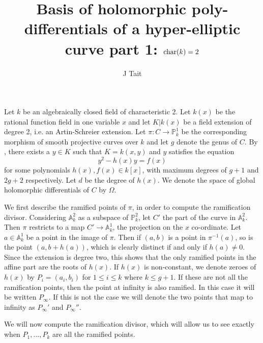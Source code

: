\documentclass[11pt]{article} %
\title{Basis of holomorphic poly-differentials of a hyper-elliptic curve part 1: $\operatorname{char} (k)=2$}
\author{J Tait}
\theoremstyle{remark}\newtheorem*{rem}{Remark}
\begin{document}
\maketitle


Let $k$ be an algebraically closed field of characteristic 2.
Let $k(x)$ be the rational function field in one variable $x$ and let $K|k(x)$ be a field extension of degree 2, i.e. an Artin-Schreier extension.
Let $\pi:C \rightarrow \mathbb P_k^1$ be the corresponding morphism of smooth projective curves over $k$ and let $g$ denote the genus of $C$.
By \cite[\S 7.4.3]{liu}, there exists a $y\in K$ such that $K=k(x,y)$ and $y$ satisfies the equation
\begin{equation}\label{1}
  y^2 - h(x)y = f(x)
\end{equation}
for some polynomials $h(x), f(x)\in k[x]$, with maximum degrees of $g+1$ and $2g+2$ respectively.
Let $d$ be the degree of $h(x)$.
We denote the space of global holomorphic differentials of $C$ by $\Omega$.

We first describe the ramified points of $\pi$, in order to compute the ramification divisor.
Considering $\mathbb A_k^2$ as a subspace of $\mathbb P_k^2$, let $C'$ the part of the curve in $\mathbb A_k^2$.
Then $\pi$ restricts to a map $C'\rightarrow \mathbb A^1_k$, the projection on the $x$ co-ordinate.
Let $a\in \mathbb A_k^1$ be a point in the image of $\pi$.
Then if $(a,b)$ is a point in $\pi^{-1}(a)$, so is the point $(a,b+h(a))$, which is clearly distinct if and only if $h(a)\neq 0$.
Since the extension is degree two, this shows that the only ramified points in the affine part are the roots of $h(x)$.
If $h(x)$ is non-constant, we denote zeroes of $h(x)$ by $P_i=(a_i,b_i)$ for $1\leq i \leq k$ where $k \leq g+1$.
If these are not all the ramification points, then the point at infinity is also ramified.
In this case it will be written $P_{\infty}$.
If this is not the case we will denote the two points that map to infinity as $P_{\infty}'$ and $P_{\infty}''$.

We will now compute the ramification divisor, which will allow us to see exactly when $P_1,\ldots,P_k$ are all the ramified points.\\
\end{document}

